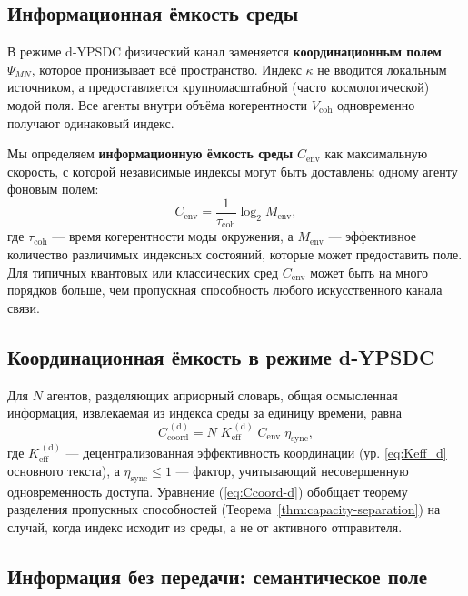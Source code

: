 \documentclass[12pt,a4paper]{article}
\theoremstyle{remark}
\begin{document}
	\subsection{Информационная ёмкость среды}
	\label{subsec:env-capacity}
	
	В режиме d-YPSDC физический канал заменяется \textbf{координационным полем} $\Psi_{MN}$, которое пронизывает всё пространство. Индекс $\kappa$ не вводится локальным источником, а предоставляется крупномасштабной (часто космологической) модой поля. Все агенты внутри объёма когерентности $V_{\mathrm{coh}}$ одновременно получают одинаковый индекс.
	
	Мы определяем \textbf{информационную ёмкость среды} $C_{\mathrm{env}}$ как максимальную скорость, с которой независимые индексы могут быть доставлены одному агенту фоновым полем:
	\begin{equation}
		C_{\mathrm{env}} = \frac{1}{\tau_{\mathrm{coh}}} \log_2 M_{\mathrm{env}},
		\label{eq:Cenv}
	\end{equation}
	где $\tau_{\mathrm{coh}}$ — время когерентности моды окружения, а $M_{\mathrm{env}}$ — эффективное количество различимых индексных состояний, которые может предоставить поле. Для типичных квантовых или классических сред $C_{\mathrm{env}}$ может быть на много порядков больше, чем пропускная способность любого искусственного канала связи.
	
	\subsection{Координационная ёмкость в режиме d-YPSDC}
	\label{subsec:coord-capacity-dypsdc}
	
	Для $N$ агентов, разделяющих априорный словарь, общая осмысленная информация, извлекаемая из индекса среды за единицу времени, равна
	\begin{equation}
		C_{\mathrm{coord}}^{\,(\mathrm{d})} = N \; K_{\mathrm{eff}}^{\,(\mathrm{d})} \;
		C_{\mathrm{env}} \; \eta_{\mathrm{sync}},
		\label{eq:Ccoord-d}
	\end{equation}
	где $K_{\mathrm{eff}}^{\,(\mathrm{d})}$ — децентрализованная эффективность координации (ур. \eqref{eq:Keff_d} основного текста), а $\eta_{\mathrm{sync}} \le 1$ — фактор, учитывающий несовершенную одновременность доступа. Уравнение (\ref{eq:Ccoord-d}) обобщает теорему разделения пропускных способностей (Теорема~\ref{thm:capacity-separation}) на случай, когда индекс исходит из среды, а не от активного отправителя.
	
	\subsection{Информация без передачи: семантическое поле}
	\label{subsec:semantic-field}
	
\end{document}
